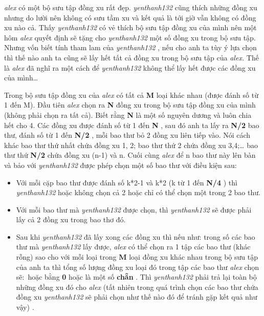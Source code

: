 



\emph{    alex   }   có một bộ sưu tập đồng xu rất đẹp.   \emph{    yenthanh132   }   cũng thích những đồng xu nhưng do lười nên không có sưu tầm xu và kết quả là tới giờ vẫn không có đồng xu nào cả. Thấy   \emph{    yenthanh132   }   có vẻ thích bộ sưu tập đồng xu của mình nên một hôm   \emph{    alex   }   quyết định sẽ tặng cho   \emph{    yenthanh132   }   một số đồng xu trong bộ sưu tập. Nhưng vốn biết tính tham lam của   \emph{    yenthanh132   }   , nếu cho anh ta tùy ý lựa chọn thì thế nào anh ta cũng sẽ lấy hết tất cả đồng xu trong bộ sưu tập của   \emph{    alex.   }   Thế là   \emph{    alex   }   đã nghĩ ra một cách để   \emph{    yenthanh132   }   không thể lấy hết được các đồng xu của mình…  

   Trong bộ sưu tập đồng xu của   \emph{    alex   }   có tất cả   \textbf{    M   }   loại khác nhau (được đánh số từ 1 đến M). Đầu tiên   \emph{    alex   }   chọn ra   \textbf{    N   }   đồng xu trong bộ sưu tập đồng xu của mình (không phải chọn ra tất cả). Biết rằng   \textbf{    N   }   là một số nguyên dương và luôn chia hết cho 4. Các đồng xu được đánh số từ 1 đến   \textbf{    N   }   , sau đó anh ta lấy ra   \textbf{    N/2   }   bao thư, đánh số từ 1 đến   \textbf{    N/2   }   , mỗi bao thư bỏ 2 đồng xu liên tiếp vào. Nói cách khác bao thư thứ nhất chứa đồng xu 1, 2; bao thư thứ 2 chứa đồng xu 3,4;… bao thư thứ   \textbf{    N/2   }   chứa đồng xu (n-1) và n. Cuối cùng   \emph{    alex   }   để n bao thư này lên bàn và bảo với   \emph{    yenthanh132   }   được phép chọn một số bao thư với điều kiện sau:  
\begin{itemize}
	\item     Với mỗi cặp bao thư được đánh số k*2-1 và k*2 (k từ 1 đến    \textbf{     N/4    }    ) thì    \emph{     yenthanh132    }    hoặc không chọn cả 2 hoặc chỉ có thể chọn một trong 2 bao thư.   
	\item     Với mỗi bao thư mà    \emph{     yenthanh132    }    được chọn, thì    \emph{     yenthanh132    }    sẽ được phải lấy cả 2 đồng xu trong bao thơ đó.   
	\item     Sau khi    \emph{     yenthanh132    }    đã lấy xong các đồng xu thì nếu như: trong số các bao thư mà    \emph{     yenthanh132    }    lấy được,    \emph{     alex    }    có thể chọn ra 1 tập các bao thư (khác rỗng) sao cho với mỗi loại trong    \textbf{     M    }    loại đồng xu khác nhau trong bộ sưu tập của anh ta thì tổng số lượng đồng xu loại đó trong tập các bao thư    \emph{     alex    }    chọn sẽ: hoặc bằng    \textbf{     0    }    hoặc là một số    \textbf{     chẵn    }    . Thì    \emph{     yenthanh132    }    phải trả lại toàn bộ những đồng xu đó cho    \emph{     alex    }    (tất nhiên trong quá trình chọn các bao thư chứa đồng xu    \emph{     yenthanh132    }    sẽ phải chọn như thế nào đó để tránh gặp kết quả như vậy)    \emph{     .    }
\end{itemize}

